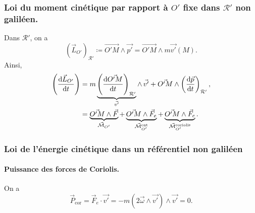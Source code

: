         \subsubsection{Loi du moment cinétique par rapport à $O'$ fixe dans $\mathcal{R}'$ non galiléen.}

            Dans $\mathcal{R}'$, on a
            \begin{equation*}
                \left(\vec{L}_{O'}\right)_{\mathcal{R}'}\coloneqq\vec{O'M}\wedge\vec{p'}=\vec{O'M}\wedge m\vec{v'}(M).
            \end{equation*}
            Ainsi,
            \begin{align*}
                \left(\frac{\mathrm{d} \vec{L}_{O'}}{\mathrm{d} t}\right)
                &=
                m\underbrace{\left(\frac{\mathrm{d} \vec{O'M}}{\mathrm{d} t}\right)_{\mathcal{R}'}}_{\vec{v'}}\wedge\,\vec{v'}+\vec{O'M}\wedge\left(\frac{\mathrm{d}\vec{p}}{\mathrm{d} t}\right)_{\mathcal{R}'},\\
                &=\underbrace{\vec{O'M}\wedge \vec{F}}_{\vec{\mathcal{M}}_{O'}}+\underbrace{\vec{O'M}\wedge\vec{F}_e}_{\vec{\mathcal{M}}^{\text{ent}}_{O'}}+\underbrace{\vec{O'M}\wedge\vec{F}_c}_{\vec{\mathcal{M}}^{\text{coriolis}}_{O'}}.
            \end{align*}

        \subsubsection{Loi de l'énergie cinétique dans un référentiel non galiléen}
            
            \paragraph{Puissance des forces de Coriolis.}
                On a 
                \begin{equation*}
                    \vec{P}_{\text{cor}}=\vec{F}_e\cdot\vec{v'}=-m\left(2\vec{\omega}\wedge\vec{v'}\right)\wedge\vec{v'}=0.
                \end{equation*}
            
